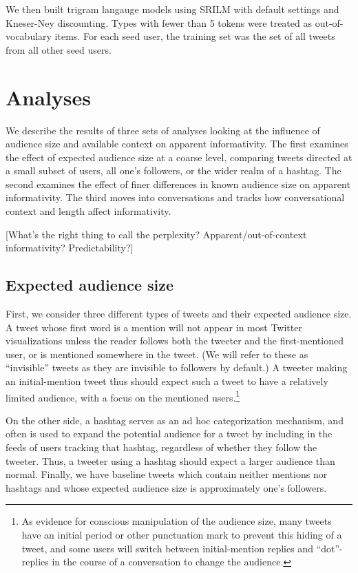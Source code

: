 \documentclass[11pt,letterpaper]{article}
\begin{document}
We then built trigram langauge models using SRILM with default settings and Kneser-Ney discounting.  Types with fewer than 5 tokens were treated as out-of-vocabulary items. For each seed user, the training set was the set of all tweets from all other seed users.  

\section{Analyses}

We describe the results of three sets of analyses looking at the influence of audience size and available context on apparent informativity. The first examines the effect of expected audience size at a coarse level, comparing tweets directed at a small subset of users, all one's followers, or the wider realm of a hashtag.   The second examines the effect of finer differences in known audience size on apparent informativity.  The third moves into conversations and tracks how conversational context and length affect informativity.

[What's the right thing to call the perplexity? Apparent/out-of-context informativity? Predictability?]

\subsection{Expected audience size}
First, we consider three different types of tweets and their expected audience size.  A tweet whose first word is a mention will not appear in most Twitter visualizations unless the reader follows both the tweeter and the first-mentioned user, or is mentioned somewhere in the tweet. (We will refer to these as ``invisible'' tweets as they are invisible to followers by default.)  A tweeter making an initial-mention tweet thus should expect such a tweet to have a relatively limited audience, with a focus on the mentioned users.\footnote{As evidence for conscious manipulation of the audience size, many tweets have an initial period or other punctuation mark to prevent this hiding of a tweet, and some users will switch between initial-mention replies and ``dot''-replies in the course of a conversation to change the audience.}

On the other side, a hashtag serves as an ad hoc categorization mechanism, and often is used to expand the potential audience for a tweet by including in the feeds of users tracking that hashtag, regardless of whether they follow the tweeter.  Thus, a tweeter using a hashtag should expect a larger audience than normal.  Finally, we have baseline tweets which contain neither mentions nor hashtags and whose expected audience size is approximately one's followers.
\end{document}
